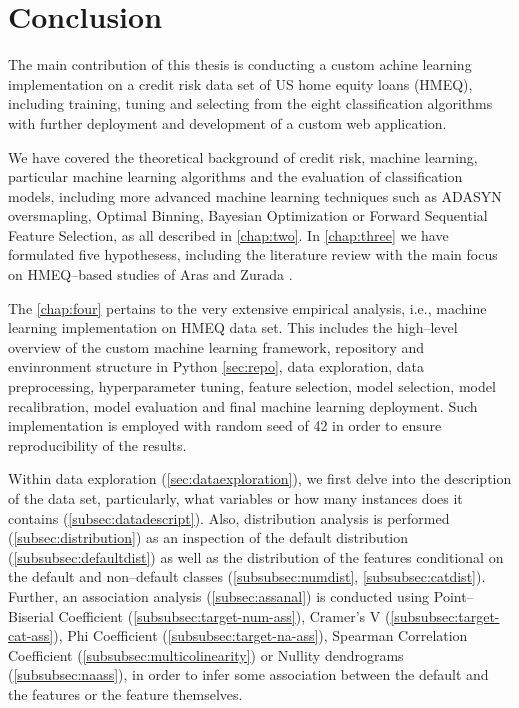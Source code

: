 \chapter{Conclusion}
\label{conclusion}

The main contribution of this thesis is conducting a custom achine learning implementation on a credit risk data set of US home equity loans (HMEQ), including training, tuning and selecting from the eight classification algorithms with further deployment and development of a custom web application.

We have covered the theoretical background of credit risk, machine learning, particular machine learning algorithms and the evaluation of classification models, including more advanced machine learning techniques such as ADASYN oversmapling, Optimal Binning, Bayesian Optimization or Forward Sequential Feature Selection, as all described in \autoref{chap:two}.
In \autoref{chap:three} we have formulated five hypothesess, including the literature review with the main focus on HMEQ--based studies of Aras \citep{serkan2021bagging} and Zurada \citep{zurada2014classification}.


The \autoref{chap:four} pertains to the very extensive empirical analysis, i.e., machine learning implementation on HMEQ data set.  This includes the high--level overview of the custom machine learning framework, repository and envinronment structure in Python \autoref{sec:repo}, data exploration, data preprocessing, hyperparameter tuning, feature selection, model selection, model recalibration, model evaluation and final machine learning deployment.
Such implementation is employed with random seed of 42 in order to ensure reproducibility of the results.

Within data exploration (\autoref{sec:dataexploration}), we first delve into the description of the data set, particularly, what variables or how many instances does it contains (\autoref{subsec:datadescript}).
Also, distribution analysis is performed (\autoref{subsec:distribution}) as an inspection of the default distribution (\autoref{subsubsec:defaultdist}) as well as the distribution of the features conditional on the default and non--default classes (\autoref{subsubsec:numdist}, \autoref{subsubsec:catdist}).
Further, an association analysis (\autoref{subsec:assanal}) is conducted using Point--Biserial Coefficient (\autoref{subsubsec:target-num-ass}),
Cramer's V (\autoref{subsubsec:target-cat-ass}), Phi Coefficient (\autoref{subsubsec:target-na-ass}), Spearman Correlation Coefficient (\autoref{subsubsec:multicolinearity}) or Nullity dendrograms (\autoref{subsubsec:naass}), in order to infer some association between the default and the features or the feature themselves.


